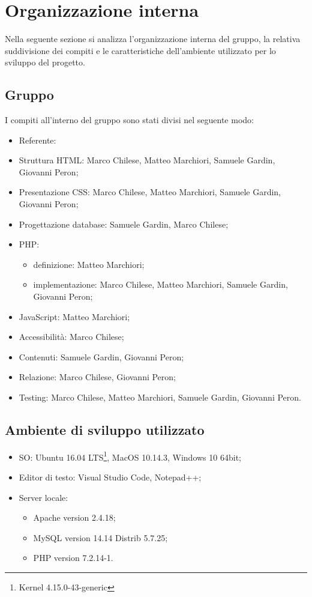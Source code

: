\section{Organizzazione interna}
Nella seguente sezione si analizza l'organizzazione interna del gruppo, la relativa suddivisione dei compiti e le caratteristiche dell'ambiente utilizzato per lo sviluppo del progetto.
\subsection{Gruppo}
I compiti all'interno del gruppo sono stati divisi nel seguente modo:
\begin{itemize}
\item Referente:
\item Struttura HTML: Marco Chilese, Matteo Marchiori, Samuele Gardin, Giovanni Peron;
\item Presentazione CSS: Marco Chilese, Matteo Marchiori, Samuele Gardin, Giovanni Peron;
\item Progettazione database: Samuele Gardin, Marco Chilese;
\item PHP: 
\begin{itemize}
	\item definizione: Matteo Marchiori;
	\item implementazione: Marco Chilese, Matteo Marchiori, Samuele Gardin, Giovanni Peron;
\end{itemize}
\item JavaScript: Matteo Marchiori;
\item Accessibilità: Marco Chilese;
\item Contenuti: Samuele Gardin, Giovanni Peron;
\item Relazione: Marco Chilese, Giovanni Peron;
\item Testing: Marco Chilese, Matteo Marchiori, Samuele Gardin, Giovanni Peron.
\end{itemize}
\subsection{Ambiente di sviluppo utilizzato}
\begin{itemize}
	\item SO: Ubuntu 16.04 LTS\footnote{Kernel 4.15.0-43-generic}, MacOS 10.14.3, Windows 10 64bit;
	\item Editor di testo: Visual Studio Code, Notepad++;
	\item Server locale:
		\begin{itemize}
			\item Apache version 2.4.18;
			\item MySQL version 14.14 Distrib 5.7.25;
			\item PHP version 7.2.14-1.
		\end{itemize} 
\end{itemize}

